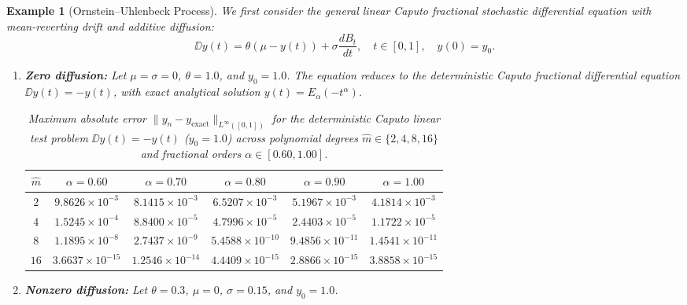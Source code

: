 \documentclass[11pt, a4paper]{article}
\theoremstyle{theoremstyle}
\theoremstyle{definitionstyle}
\newtheorem{example}[theorem]{Example}
\newcommand{\sdv}{\frac{dB_t}{dt}}
\begin{document}
\begin{example}[Ornstein--Uhlenbeck Process]
\label{ex:linear_fractional_sde}
We first consider the general linear Caputo fractional stochastic differential equation with mean-reverting drift and additive diffusion:
\begin{equation}
    \DD y(t) = \theta(\mu - y(t)) + \sigma \sdv, \quad t \in [0, 1], \quad y(0) = y_0.
\end{equation}
\begin{enumerate}
    \item \textbf{Zero diffusion:} Let $\mu = \sigma = 0$, $\theta = 1.0$, and $y_0 = 1.0$. The equation reduces to the deterministic Caputo fractional differential equation $\DD y(t) = -y(t)$, with exact analytical solution $y(t) = E_\alpha(-t^\alpha)$.
    
    \begin{table}[htbp]
    \centering
    \caption{Maximum absolute error $\|y_n - y_\mathrm{exact}\|_{L^\infty([0,1])}$ for the deterministic Caputo linear test problem $\DD y(t) = -y(t)$ ($y_0 = 1.0$) across polynomial degrees $\hat{m} \in \{2, 4, 8, 16\}$ and fractional orders $\alpha \in [0.60, 1.00]$.}
    \label{tab:exp1_deterministic_abs_error}
    \begin{adjustbox}{max width=\textwidth}
    \begin{tabular}{cccccc}
    \toprule
    $\hat{m}$ & $\alpha = 0.60$ & $\alpha = 0.70$ & $\alpha = 0.80$ & $\alpha = 0.90$ & $\alpha = 1.00$ \\
    \midrule
    $2$  & $9.8626 \times 10^{-3}$ & $8.1415 \times 10^{-3}$ & $6.5207 \times 10^{-3}$ & $5.1967 \times 10^{-3}$ & $4.1814 \times 10^{-3}$ \\
    $4$  & $1.5245 \times 10^{-4}$ & $8.8400 \times 10^{-5}$ & $4.7996 \times 10^{-5}$ & $2.4403 \times 10^{-5}$ & $1.1722 \times 10^{-5}$ \\
    $8$  & $1.1895 \times 10^{-8}$ & $2.7437 \times 10^{-9}$ & $5.4588 \times 10^{-10}$ & $9.4856 \times 10^{-11}$ & $1.4541 \times 10^{-11}$ \\
    $16$ & $3.6637 \times 10^{-15}$ & $1.2546 \times 10^{-14}$ & $4.4409 \times 10^{-15}$ & $2.8866 \times 10^{-15}$ & $3.8858 \times 10^{-15}$ \\
    \bottomrule
    \end{tabular}
    \end{adjustbox}
    \end{table}

    \item \textbf{Nonzero diffusion:} Let $\theta = 0.3$, $\mu = 0$, $\sigma = 0.15$, and $y_0 = 1.0$.


\end{enumerate}
\end{example}
\end{document}
